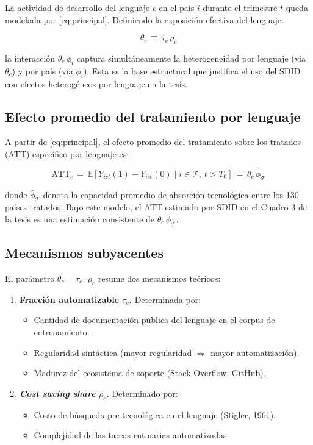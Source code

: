 \documentclass[11pt,a4paper]{article}
\theoremstyle{definition}
\begin{document}
La actividad de desarrollo del lenguaje $c$ en el país $i$ durante el trimestre $t$ queda modelada por \eqref{eq:principal}. Definiendo la exposición efectiva del lenguaje:

\begin{equation}
\theta_c \,\equiv\, \tau_c\,\rho_c
\label{eq:theta}
\end{equation}

la interacción $\theta_c\,\phi_i$ captura simultáneamente la heterogeneidad por lenguaje (via $\theta_c$) y por país (via $\phi_i$). Esta es la base estructural que justifica el uso del SDID con efectos heterogéneos por lenguaje en la tesis.

\subsection{Efecto promedio del tratamiento por lenguaje}

A partir de \eqref{eq:principal}, el efecto promedio del tratamiento sobre los tratados (ATT) específico por lenguaje es:

\begin{equation}
\text{ATT}_c \,=\, \mathbb{E}\!\left[Y_{ict}(1) - Y_{ict}(0) \mid i \in \mathcal{T},\, t > T_0\right] \,=\, \theta_c \,\bar{\phi}_{\mathcal{T}}
\label{eq:att}
\end{equation}

donde $\bar{\phi}_{\mathcal{T}}$ denota la capacidad promedio de absorción tecnológica entre los 130 países tratados. Bajo este modelo, el ATT estimado por SDID en el Cuadro 3 de la tesis es una estimación consistente de $\theta_c \,\bar{\phi}_{\mathcal{T}}$.

\subsection{Mecanismos subyacentes}

El parámetro $\theta_c = \tau_c \cdot \rho_c$ resume dos mecanismos teóricos:

\begin{enumerate}[leftmargin=*]
  \item \textbf{Fracción automatizable $\tau_c$.} Determinada por:
    \begin{itemize}\small
      \item Cantidad de documentación pública del lenguaje en el corpus de entrenamiento.
      \item Regularidad sintáctica (mayor regularidad $\Rightarrow$ mayor automatización).
      \item Madurez del ecosistema de soporte (Stack Overflow, GitHub).
    \end{itemize}
  \item \textbf{\textit{Cost saving share} $\rho_c$.} Determinado por:
    \begin{itemize}\small
      \item Costo de búsqueda pre-tecnológica en el lenguaje (Stigler, 1961).
      \item Complejidad de las tareas rutinarias automatizadas.
    \end{itemize}
\end{enumerate}
\end{document}
